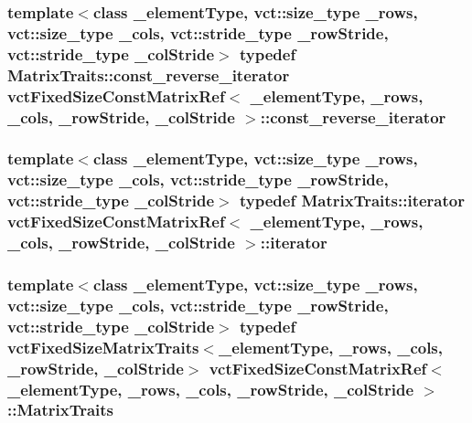 \hypertarget{classvct_fixed_size_const_matrix_ref_a65f582be5b2d72ce89267a7255605844}{
\subsubsection[{const\-\_\-reverse\-\_\-iterator}]{\setlength{\rightskip}{0pt plus 5cm}template$<$class \-\_\-element\-Type, vct\-::size\-\_\-type \-\_\-rows, vct\-::size\-\_\-type \-\_\-cols, vct\-::stride\-\_\-type \-\_\-row\-Stride, vct\-::stride\-\_\-type \-\_\-col\-Stride$>$ typedef {\bf Matrix\-Traits\-::const\-\_\-reverse\-\_\-iterator} {\bf vct\-Fixed\-Size\-Const\-Matrix\-Ref}$<$ \-\_\-element\-Type, \-\_\-rows, \-\_\-cols, \-\_\-row\-Stride, \-\_\-col\-Stride $>$\-::{\bf const\-\_\-reverse\-\_\-iterator}}}\label{classvct_fixed_size_const_matrix_ref_a65f582be5b2d72ce89267a7255605844}
\hypertarget{classvct_fixed_size_const_matrix_ref_aabd708b8d6137ad684ee64e121c645b2}{
\subsubsection[{iterator}]{\setlength{\rightskip}{0pt plus 5cm}template$<$class \-\_\-element\-Type, vct\-::size\-\_\-type \-\_\-rows, vct\-::size\-\_\-type \-\_\-cols, vct\-::stride\-\_\-type \-\_\-row\-Stride, vct\-::stride\-\_\-type \-\_\-col\-Stride$>$ typedef {\bf Matrix\-Traits\-::iterator} {\bf vct\-Fixed\-Size\-Const\-Matrix\-Ref}$<$ \-\_\-element\-Type, \-\_\-rows, \-\_\-cols, \-\_\-row\-Stride, \-\_\-col\-Stride $>$\-::{\bf iterator}}}\label{classvct_fixed_size_const_matrix_ref_aabd708b8d6137ad684ee64e121c645b2}
\hypertarget{classvct_fixed_size_const_matrix_ref_ac6b99932c13ec23f2c083fc719af757e}{
\subsubsection[{Matrix\-Traits}]{\setlength{\rightskip}{0pt plus 5cm}template$<$class \-\_\-element\-Type, vct\-::size\-\_\-type \-\_\-rows, vct\-::size\-\_\-type \-\_\-cols, vct\-::stride\-\_\-type \-\_\-row\-Stride, vct\-::stride\-\_\-type \-\_\-col\-Stride$>$ typedef {\bf vct\-Fixed\-Size\-Matrix\-Traits}$<$\-\_\-element\-Type, \-\_\-rows, \-\_\-cols, \-\_\-row\-Stride, \-\_\-col\-Stride$>$ {\bf vct\-Fixed\-Size\-Const\-Matrix\-Ref}$<$ \-\_\-element\-Type, \-\_\-rows, \-\_\-cols, \-\_\-row\-Stride, \-\_\-col\-Stride $>$\-::{\bf Matrix\-Traits}}}\label{classvct_fixed_size_const_matrix_ref_ac6b99932c13ec23f2c083fc719af757e}

